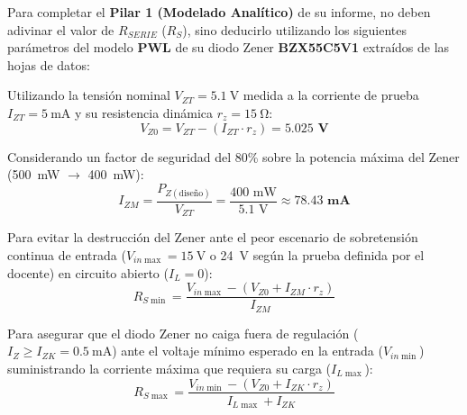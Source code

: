 \documentclass[11pt, a4paper]{article}
\begin{document}
Para completar el \textbf{Pilar 1 (Modelado Analítico)} de su informe, no deben adivinar el valor de $R_{SERIE}$ ($R_S$), sino deducirlo utilizando los siguientes parámetros del modelo \textbf{PWL} de su diodo Zener \textbf{BZX55C5V1} extraídos de las hojas de datos:

\vspace{0.3cm}

\begin{cajaformula}
Utilizando la tensión nominal $V_{ZT} = \qty{5.1}{\volt}$ medida a la corriente de prueba $I_{ZT} = \qty{5}{\milli\ampere}$ y su resistencia dinámica $r_z = \qty{15}{\ohm}$:
\begin{equation*}
    V_{Z0} = V_{ZT} - (I_{ZT} \cdot r_z) = \mathbf{5.025\text{ V}}
\end{equation*}
\end{cajaformula}

\begin{cajaformula}
Considerando un factor de seguridad del 80\% sobre la potencia máxima del Zener (\qty{500}{\milli\watt} $\to$ \qty{400}{\milli\watt}):
\begin{equation*}
    I_{ZM} = \frac{P_{Z(\text{diseño})}}{V_{ZT}} = \frac{400\text{ mW}}{5.1\text{ V}} \approx \mathbf{78.43\text{ mA}}
\end{equation*}
\end{cajaformula}

\begin{cajaformula}
Para evitar la destrucción del Zener ante el peor escenario de sobretensión continua de entrada ($V_{in\max} = \qty{15}{\volt}$ o \qty{24}{\volt} según la prueba definida por el docente) en circuito abierto ($I_L = 0$):
\begin{equation*}
    R_{S\min} = \frac{V_{in\max} - (V_{Z0} + I_{ZM} \cdot r_z)}{I_{ZM}}
\end{equation*}
\end{cajaformula}

\begin{cajaformula}
Para asegurar que el diodo Zener no caiga fuera de regulación ($I_Z \ge I_{ZK} = \qty{0.5}{\milli\ampere}$) ante el voltaje mínimo esperado en la entrada ($V_{in\min}$) suministrando la corriente máxima que requiera su carga ($I_{L\max}$):
\begin{equation*}
    R_{S\max} = \frac{V_{in\min} - (V_{Z0} + I_{ZK} \cdot r_z)}{I_{L\max} + I_{ZK}}
\end{equation*}
\end{cajaformula}
\end{document}
